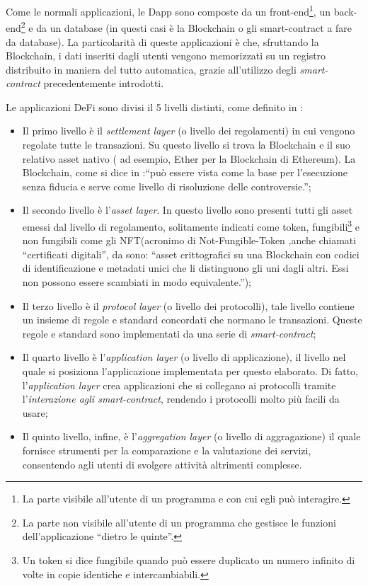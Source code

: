 Come le normali applicazioni, le Dapp sono composte da un front-end\footnote{La parte visibile all'utente di un programma e con cui egli può interagire.}, un back-end\footnote{La parte non visibile all'utente di un programma che gestisce le funzioni dell'applicazione “dietro le quinte”.} e da un database (in questi casi è la Blockchain o gli smart-contract a fare da database).
La particolarità di queste applicazioni è che, sfruttando la Blockchain, i dati inseriti dagli utenti vengono memorizzati su un registro distribuito in maniera del tutto automatica, grazie all'utilizzo degli \textit{smart-contract} precedentemente introdotti.

Le applicazioni DeFi sono divisi il 5 livelli distinti, come definito in \cite{DeFi_article}:
\begin{itemize} 
 \item Il primo livello è il \textit{settlement layer} (o livello dei regolamenti) in cui vengono regolate tutte le transazioni. Su questo livello si trova la Blockchain e il suo relativo asset nativo ( ad esempio, Ether per la Blockchain di Ethereum).
 La Blockchain, come si dice in \cite{DeFi_article}:“può essere vista come la base per l'esecuzione senza fiducia e serve come livello di risoluzione delle controversie.”;
 \item Il secondo livello è l'\textit{asset layer}. In questo livello sono presenti tutti gli asset emessi dal livello di regolamento, solitamente indicati come token, fungibili\footnote{Un token si dice fungibile quando può essere duplicato un numero infinito di volte in copie identiche e intercambiabili.} e non fungibili come gli NFT(acronimo di Not-Fungible-Token ,anche chiamati “certificati digitali”, da \cite{NFT_definizione} sono: “asset crittografici su una Blockchain con codici di identificazione e metadati unici che li distinguono gli uni dagli altri. Essi non possono essere scambiati in modo equivalente.”);
 
 \item Il terzo livello è il \textit{protocol layer} (o livello dei protocolli), tale livello contiene un insieme di regole e standard concordati che normano le transazioni. Queste regole e standard sono implementati da una serie di \textit{smart-contract};
 \item Il quarto livello è l'\textit{application layer} (o livello di applicazione), il livello nel quale si posiziona l'applicazione implementata per questo elaborato.
 Di fatto, l'\textit{application layer} crea applicazioni che si collegano ai protocolli tramite l'\textit{interazione agli smart-contract}, rendendo i protocolli molto più facili da usare;
 \item Il quinto livello, infine, è l'\textit{aggregation layer} (o livello di aggragazione) il quale fornisce strumenti per la comparazione e la valutazione dei servizi, consentendo agli utenti di svolgere attività altrimenti complesse.
 \end{itemize}

